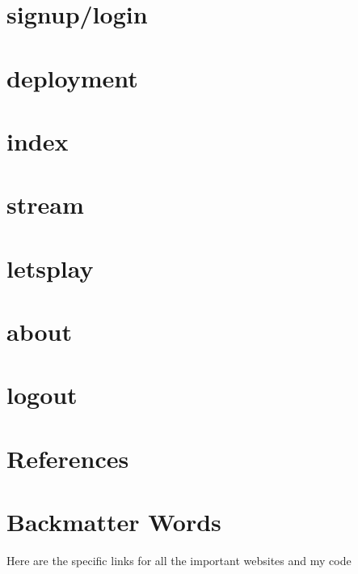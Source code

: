 \documentclass{article}
\begin{document}
\cleardoublepage



\section{signup/login}
\cleardoublepage



\section{deployment}
\cleardoublepage



\section{}
\cleardoublepage



\section{index}
\cleardoublepage



\section{stream}
\cleardoublepage

\section{letsplay}
\cleardoublepage

\section{about}
\cleardoublepage

\section{logout}
\cleardoublepage

\section{}
\cleardoublepage

\section{}
\cleardoublepage



\section{References}





\cleardoublepage




\appendix
\section{Backmatter Words}
Here are the specific links for all the important websites and my code
\end{document}
